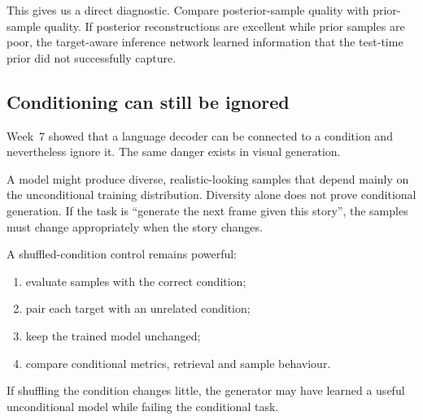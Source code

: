 This gives us a direct diagnostic. Compare posterior-sample quality with prior-sample quality. If posterior reconstructions are excellent while prior samples are poor, the target-aware inference network learned information that the test-time prior did not successfully capture.

\subsection{Conditioning can still be ignored}

Week~7 showed that a language decoder can be connected to a condition and nevertheless ignore it. The same danger exists in visual generation.

A model might produce diverse, realistic-looking samples that depend mainly on the unconditional training distribution. Diversity alone does not prove conditional generation. If the task is ``generate the next frame given this story'', the samples must change appropriately when the story changes.

A shuffled-condition control remains powerful:
\begin{enumerate}[leftmargin=*]
  \item evaluate samples with the correct condition;
  \item pair each target with an unrelated condition;
  \item keep the trained model unchanged;
  \item compare conditional metrics, retrieval and sample behaviour.
\end{enumerate}
If shuffling the condition changes little, the generator may have learned a useful unconditional model while failing the conditional task.

